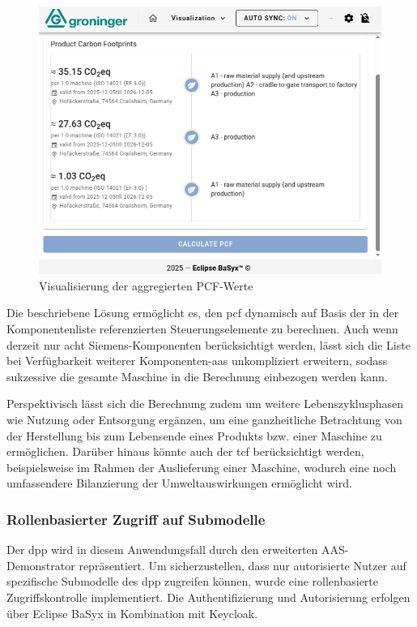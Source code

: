 \begin{figure}[htbp]
    \centering
        \includegraphics[width=1\textwidth]{Bilder/Ergebnisse/DPP/PluginTest.png}
    \caption{Visualisierung der aggregierten PCF-Werte}
    \label{fig:PluginAggregation}
\end{figure}

Die beschriebene Lösung ermöglicht es, den \acs{pcf} dynamisch auf Basis der in der Komponentenliste referenzierten Steuerungselemente zu berechnen. 
Auch wenn derzeit nur acht Siemens-Komponenten berücksichtigt werden, lässt sich die Liste bei Verfügbarkeit weiterer Komponenten-\acs{aas} unkompliziert erweitern, sodass sukzessive die gesamte Maschine in die Berechnung einbezogen werden kann.

Perspektivisch lässt sich die Berechnung zudem um weitere Lebenszyklusphasen wie Nutzung oder Entsorgung ergänzen, um eine ganzheitliche Betrachtung von der Herstellung bis zum Lebensende eines Produkts bzw. einer Maschine zu ermöglichen.
Darüber hinaus könnte auch der \acs{tcf} berücksichtigt werden, beispielsweise im Rahmen der Auslieferung einer Maschine, wodurch eine noch umfassendere Bilanzierung der Umweltauswirkungen ermöglicht wird.

\subsubsection{Rollenbasierter Zugriff auf Submodelle}
Der \acs{dpp} wird in diesem Anwendungsfall durch den erweiterten AAS-Demonstrator repräsentiert.  
Um sicherzustellen, dass nur autorisierte Nutzer auf spezifische Submodelle des \acs{dpp} zugreifen können, wurde eine rollenbasierte Zugriffskontrolle implementiert.  
Die Authentifizierung und Autorisierung erfolgen über Eclipse BaSyx in Kombination mit Keycloak.

